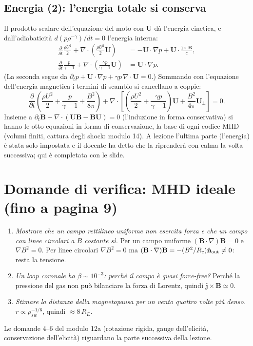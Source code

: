 \subsection{Energia (2): l'energia totale si conserva}
Il prodotto scalare dell'equazione del moto con $\mathbf{U}$ dà l'energia cinetica, e dall'adiabaticità $d(p\rho^{-\gamma})/dt=0$ l'energia interna:
\begin{align}
\frac{\partial}{\partial t}\frac{\rho U^2}{2}+\nabla\cdot\left(\frac{\rho U^2}{2}\mathbf{U}\right)&=-\mathbf{U}\cdot\nabla p+\mathbf{U}\cdot\frac{\mathbf{j}\times\mathbf{B}}{c},\\
\frac{\partial}{\partial t}\frac{p}{\gamma-1}+\nabla\cdot\left(\frac{\gamma p}{\gamma-1}\mathbf{U}\right)&=\mathbf{U}\cdot\nabla p .
\end{align}
(La seconda segue da $\partial_tp+\mathbf{U}\cdot\nabla p+\gamma p\,\nabla\cdot\mathbf{U}=0$.) Sommando con l'equazione dell'energia magnetica i termini di scambio si cancellano a coppie:
\begin{equation}
\frac{\partial}{\partial t}\left(\frac{\rho U^2}{2}+\frac{p}{\gamma-1}+\frac{B^2}{8\pi}\right)+\nabla\cdot\left[\left(\frac{\rho U^2}{2}+\frac{\gamma p}{\gamma-1}\right)\mathbf{U}+\frac{B^2}{4\pi}\mathbf{U}_\perp\right]=0 .
\end{equation}
Insieme a $\partial_t\mathbf{B}+\nabla\cdot(\mathbf{U}\mathbf{B}-\mathbf{B}\mathbf{U})=0$ (l'induzione in forma conservativa) si hanno le otto equazioni in forma di conservazione, la base di ogni codice MHD (volumi finiti, cattura degli shock: modulo 14). A lezione l'ultima parte (l'energia) è stata solo impostata e il docente ha detto che la riprenderà con calma la volta successiva; qui è completata con le slide.

\section{Domande di verifica: MHD ideale (fino a pagina 9)}
\begin{enumerate}
\item \textit{Mostrare che un campo rettilineo uniforme non esercita forza e che un campo con linee circolari a $B$ costante sì.} Per un campo uniforme $(\mathbf{B}\cdot\nabla)\mathbf{B}=0$ e $\nabla B^2=0$. Per linee circolari $\nabla B^2=0$ ma $(\mathbf{B}\cdot\nabla)\mathbf{B}=-(B^2/R_c)\hat{\mathbf{n}}_{\rm out}\neq0$: resta la tensione.
\item \textit{Un loop coronale ha $\beta\sim10^{-3}$: perché il campo è quasi force-free?} Perché la pressione del gas non può bilanciare la forza di Lorentz, quindi $\mathbf{j}\times\mathbf{B}\simeq0$.
\item \textit{Stimare la distanza della magnetopausa per un vento quattro volte più denso.} $r\propto\rho_{sw}^{-1/6}$, quindi $\approx8\,R_E$.
\end{enumerate}
Le domande 4--6 del modulo 12a (rotazione rigida, gauge dell'elicità, conservazione dell'elicità) riguardano la parte successiva della lezione.


